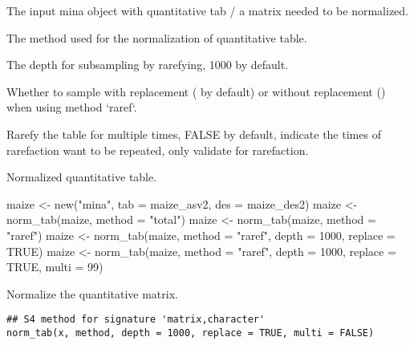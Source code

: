 \documentclass[a4paper]{book}
\begin{document}
%
\begin{Arguments}
\begin{ldescription}
\item[\code{x}] The input mina object with quantitative tab / a matrix needed to be
normalized.

\item[\code{method}] The method used for the normalization of quantitative table.

\item[\code{depth}] The depth for subsampling by rarefying, 1000 by default.

\item[\code{replace}] Whether to sample with replacement ( by default) or
without replacement () when using method `raref`.

\item[\code{multi}] Rarefy the table for multiple times, FALSE by default, indicate
the times of rarefaction want to be repeated, only validate for rarefaction.
\end{ldescription}
\end{Arguments}
%
\begin{Value}
Normalized quantitative table.
\end{Value}
%
\begin{Examples}
\begin{ExampleCode}
maize <- new("mina", tab = maize_asv2, des = maize_des2)
maize <- norm_tab(maize, method = "total")
maize <- norm_tab(maize, method = "raref")
maize <- norm_tab(maize, method = "raref", depth = 1000, replace = TRUE)
maize <- norm_tab(maize, method = "raref", depth = 1000, replace = TRUE,
multi = 99)
\end{ExampleCode}
\end{Examples}
%
\begin{Description}\relax
Normalize the quantitative matrix.
\end{Description}
%
\begin{Usage}
\begin{verbatim}
## S4 method for signature 'matrix,character'
norm_tab(x, method, depth = 1000, replace = TRUE, multi = FALSE)
\end{verbatim}
\end{Usage}
%
\end{document}
